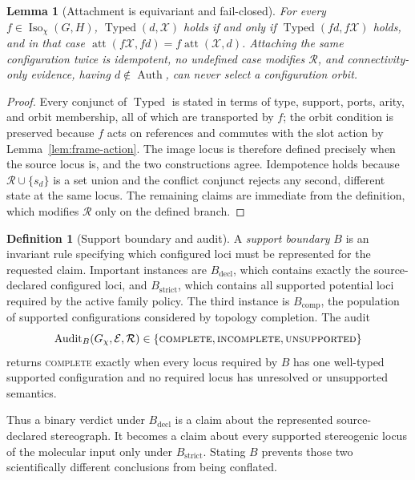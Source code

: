 \documentclass[pdflatex,sn-mathphys-num,referee,lineno]{sn-jnl}
\theoremstyle{plain}
\newtheorem{lemma}[theorem]{Lemma}
\theoremstyle{remark}
\theoremstyle{definition}
\newtheorem{definition}{Definition}
\begin{document}
\begin{lemma}[Attachment is equivariant and fail-closed]
\label{lem:attachment}
For every \(f\in\operatorname{Iso}_\chi(G,H)\),
\(\operatorname{Typed}(d,\mathcal X)\) holds if and only if
\(\operatorname{Typed}(f d,f\mathcal X)\) holds, and in that case
\(\operatorname{att}(f\mathcal X,f d)=f\operatorname{att}(\mathcal X,d)\).
Attaching the same configuration twice is idempotent, no undefined case
modifies \(\mathcal R\), and connectivity-only evidence, having
\(d\notin\operatorname{Auth}\), can never select a configuration orbit.
\end{lemma}

\begin{proof}
Every conjunct of \(\operatorname{Typed}\) is stated in terms of type, support,
ports, arity, and orbit membership, all of which are transported by \(f\); the
orbit condition is preserved because \(f\) acts on references and commutes with
the slot action by Lemma~\ref{lem:frame-action}.  The image locus is therefore
defined precisely when the source locus is, and the two constructions agree.
Idempotence holds because \(\mathcal R\cup\{s_d\}\) is a set union and the
conflict conjunct rejects any second, different state at the same locus.  The
remaining claims are immediate from the definition, which modifies
\(\mathcal R\) only on the defined branch.
\end{proof}

\begin{definition}[Support boundary and audit]
\label{def:support-boundary}
A \emph{support boundary} \(B\) is an invariant rule specifying which
configured loci must be represented for the requested claim.  Important
instances are \(B_{\mathrm{decl}}\), which contains exactly the source-declared
configured loci, and \(B_{\mathrm{strict}}\), which contains all supported
potential loci required by the active family policy.  The third instance is
\(B_{\mathrm{comp}}\), the population of supported configurations considered
by topology completion.  The audit
\[
  \operatorname{Audit}_{B}(G_\chi,\mathcal E,\mathcal R)
  \in\{\textsc{complete},\textsc{incomplete},\textsc{unsupported}\}
\]
returns \textsc{complete} exactly when every locus required by \(B\) has one
well-typed supported configuration and no required locus has unresolved or
unsupported semantics.
\end{definition}

Thus a binary verdict under \(B_{\mathrm{decl}}\) is a claim about the
represented source-declared stereograph.  It becomes a claim about every
supported stereogenic locus of the molecular input only under
\(B_{\mathrm{strict}}\).  Stating \(B\) prevents those two scientifically
different conclusions from being conflated.
\end{document}
